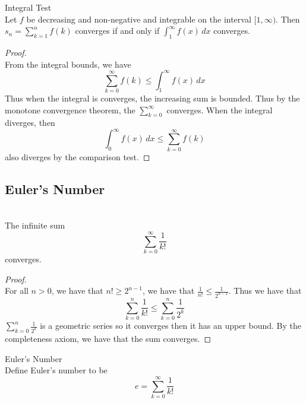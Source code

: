 \documentclass[a4paper]{article}
\begin{document}
\begin{thm}{Integral Test}{}\\ Let $f$ be decreasing and non-negative and integrable on the interval $[1,\infty)$. Then $s_n=\sum_{k=1}^{n}f(k)$ converges if and only if $\int_{1}^{\infty}f(x)\,dx$ converges. 
\begin{proof}\\ From the integral bounds, we have $$\sum_{k=0}^{\infty}f(k)\leq\int_{1}^{\infty}f(x)\,dx$$ Thus when the integral is converges, the increasing sum is bounded. Thus by the monotone convergence theorem, the $\sum_{k=0}^{\infty}$ converges. When the integral diverges, then $$\int_{0}^{\infty}f(x)\,dx\leq\sum_{k=0}^{\infty}f(k)$$ also diverges by the comparison test. 
\end{proof}
\end{thm}

\subsection{Euler's Number}
\begin{lmm}{}{}\\ The infinite sum $$\sum_{k=0}^{\infty}\frac{1}{k!}$$ converges. 
\begin{proof}\\  For all $n>0$, we have that $n!\geq2^{n-1}$, we have that $\frac{1}{n!}\leq\frac{1}{2^{n-1}}$. Thus we have that $$\sum_{k=0}^{n}\frac{1}{k!}\leq\sum_{k=0}^{n}\frac{1}{2^{k}}$$ $\sum_{k=0}^{n}\frac{1}{2^{k}}$ is a geometric series so it converges then it has an upper bound. By the completeness axiom, we have that the sum converges. 
\end{proof}
\end{lmm}

\begin{defn}{Euler's Number}{}\\ Define Euler's number to be $$e=\sum_{k=0}^{\infty}\frac{1}{k!}$$
\end{defn}
\end{document}
